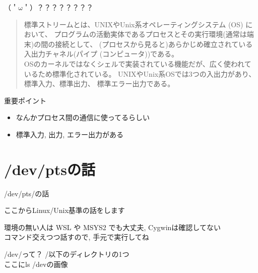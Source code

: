 \documentclass[uplatex, dvipdfmx, unicode]{beamer}
\begin{document}
\begin{frame}
  \centering
  \Huge{（＇$\mathrm{\omega}$＇）？？？？？？？？}
\end{frame}

\begin{frame}
  \begin{quote}
    標準ストリームとは、UNIXやUnix系オペレーティングシステム (OS) において、
    \alert{プログラムの活動実体であるプロセスとその実行環境(通常は端末)の間の接続}として、
    (プロセスから見ると)あらかじめ確立されている\alert{入出力チャネル}(パイプ (コンピュータ))である。 \\
    OSのカーネルではなくシェルで実装されている機能だが、広く使われているため標準化されている。
    UNIXやUnix系OSでは3つの入出力があり、\alert{標準入力、標準出力、
    標準エラー出力}である。
  \end{quote}
\end{frame}

\begin{frame}{重要ポイント}
  \begin{itemize}
    \item{なんかプロセス間の通信に使ってるらしい}
    \item{標準入力, 出力, エラー出力がある}
  \end{itemize}
\end{frame}

\section{/dev/ptsの話}

\begin{frame}
  \Huge{\alert{/dev/pts/の話}}
\end{frame}

\begin{frame}
  \Large{\alert{ここからLinux/Unix基準の話をします}\faLinux} \\
  \vspace{0.2in}

  \normalsize
  環境の無い人は WSL や MSYS2 でも大丈夫, Cygwinは確認してない \\
  コマンド交えつつ話すので, 手元で実行してね
\end{frame}

\begin{frame}{/dev/って？}
  /以下のディレクトリの1つ \\
  \vspace{0.2in}
  ここにls /devの画像
\end{frame}
\end{document}
